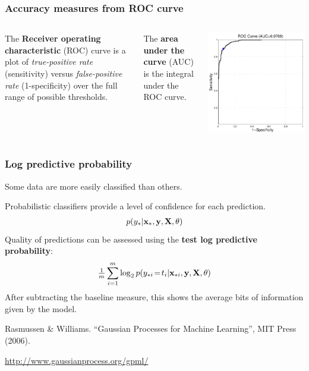 \begin{frame}
\frametitle{Accuracy measures from ROC curve}
\begin{columns}
The {\bf Receiver operating characteristic} (ROC) curve is a plot of \emph{true-positive rate} (sensitivity) versus \emph{false-positive rate} (1-specificity) over the full range of possible thresholds.\par
\vspace{0.25cm}
The {\bf area under the curve} (AUC) is the integral under the ROC curve.\par
{}
\includegraphics[width=\textwidth]{roc}
\end{columns}
\end{frame}

\begin{frame}
\frametitle{Log predictive probability}
Some data are more easily classified than others.\par
Probabilistic classifiers provide a level of confidence for each prediction.
\begin{align*}
p(y_*|{\bf x}_*,{\bf y},{\bf X},\theta)
\end{align*}
Quality of predictions can be assessed using the {\bf test log predictive probability}:
\begin{align*}
\tfrac{1}{m}\sum_{i=1}^m \log_2 p(y_{*i}\!=\!t_i|{\bf x}_{*i},{\bf y},{\bf X},\theta)
\end{align*}
After subtracting the baseline measure, this shows the average bits of information given by the model.\par
\vspace{0.25cm}
\begin{tiny}
Rasmussen \& Williams. ``Gaussian Processes for Machine Learning'', MIT Press (2006).\par
\url{http://www.gaussianprocess.org/gpml/}\par
\end{tiny}
\end{frame}


